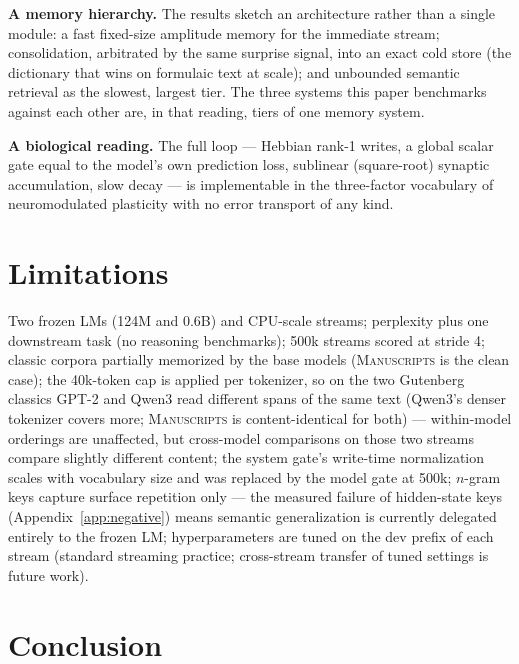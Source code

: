 \documentclass[11pt]{article}
\begin{document}
\textbf{A memory hierarchy.} The results sketch an architecture rather than a single module: a fast fixed-size amplitude memory for the immediate stream; consolidation, arbitrated by the same surprise signal, into an exact cold store (the dictionary that wins on formulaic text at scale); and unbounded semantic retrieval as the slowest, largest tier. The three systems this paper benchmarks against each other are, in that reading, tiers of one memory system.

\textbf{A biological reading.} The full loop --- Hebbian rank-1 writes, a global scalar gate equal to the model's own prediction loss, sublinear (square-root) synaptic accumulation, slow decay --- is implementable in the three-factor vocabulary of neuromodulated plasticity \cite{fremaux,izhikevich} with no error transport of any kind.

\section{Limitations}

Two frozen LMs (124M and 0.6B) and CPU-scale streams; perplexity plus one downstream task (no reasoning benchmarks); 500k streams scored at stride 4; classic corpora partially memorized by the base models (\textsc{Manuscripts} is the clean case); the 40k-token cap is applied per tokenizer, so on the two Gutenberg classics GPT-2 and Qwen3 read different spans of the same text (Qwen3's denser tokenizer covers more; \textsc{Manuscripts} is content-identical for both) --- within-model orderings are unaffected, but cross-model comparisons on those two streams compare slightly different content; the system gate's write-time normalization scales with vocabulary size and was replaced by the model gate at 500k; $n$-gram keys capture surface repetition only --- the measured failure of hidden-state keys (Appendix~\ref{app:negative}) means semantic generalization is currently delegated entirely to the frozen LM; hyperparameters are tuned on the dev prefix of each stream (standard streaming practice; cross-stream transfer of tuned settings is future work).

\section{Conclusion}
\end{document}
